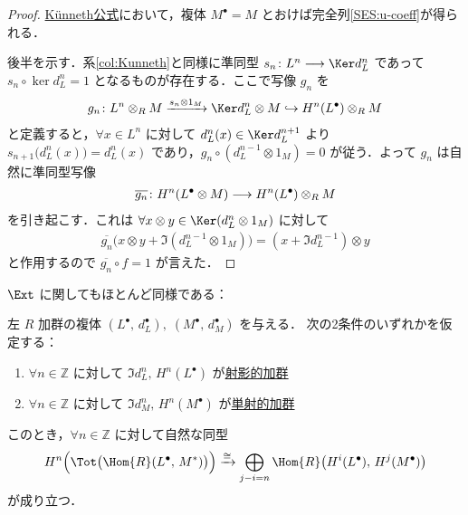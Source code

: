 \documentclass[algtopo_main]{subfiles}
\begin{document}
\begin{proof}
    \hyperref[col:Kunneth]{K\"unneth公式}において，複体 $M^\bullet = M$ とおけば完全列\eqref{SES:u-coeff}が得られる．

    後半を示す．系\ref{col:Kunneth}と同様に準同型 $s_n \colon L^n \lto \Ker d_L^n$ であって $s_n \circ \ker d_L^n = 1$ となるものが存在する．ここで写像 $g_n$ を
    \begin{align}
        g_n \colon L^n \otimes_R M \xrightarrow{s_n \otimes 1_M} \Ker d_L^n \otimes M \hookrightarrow H^n(L^\bullet) \otimes_R M
    \end{align}
    と定義すると，$\forall x \in L^n$ に対して $d_L^n(x) \in \Ker d_L^{n+1}$ より $s_{n+1} \bigl( d_L^n(x) \bigr) = d_L^n(x)$ であり，$g_{n} \circ (d_L^{n-1} \otimes 1_M) = 0$ が従う．よって $g_n$ は自然に準同型写像
    \begin{align}
        \overline{g_n} \colon H^n (L^\bullet \otimes M) \longrightarrow H^n(L^\bullet) \otimes_R M
    \end{align}
    を引き起こす．これは $\forall x \otimes y \in \Ker (d_L^n \otimes 1_M)$ に対して
    \begin{align}
        \overline{g_n} \bigl(x \otimes y + \Im (d_L^{n-1} \otimes 1_M)\bigr) = (x + \Im d_L^{n-1}) \otimes y
    \end{align}
    と作用するので $\overline{g_n} \circ f = 1$ が言えた．
\end{proof}

$\Ext$ に関してもほとんど同様である：

\begin{mylem}[label=lem:Kunneth-Ext]{}
    左 $R$ 加群の複体 $(L^\bullet,\, d_L^\bullet),\; (M^\bullet,\, d_M^\bullet)$ を与える．
    次の2条件のいずれかを仮定する：
    \begin{enumerate}
        \item $\forall n \in \mathbb{Z}$ に対して $\Im d_L^n,\, H^n(L^\bullet)$ が\hyperref[def:proj-mod]{射影的加群}
        \item $\forall n \in \mathbb{Z}$ に対して $\Im d_M^n,\, H^n(M^\bullet)$ が\hyperref[def:inj-mod]{単射的加群}
    \end{enumerate}
    

    このとき，$\forall n \in \mathbb{Z}$ に対して自然な同型
    \begin{align}
        H^n \Bigl( \Tot \bigl( \Hom{R}(L^\bullet,\, M^*) \bigr)  \Bigr)  \xrightarrow{\cong} \bigoplus_{j-i = n} \Hom{R} \bigl(H^i(L^\bullet),\, H^j(M^\bullet)\bigr)
    \end{align}
    が成り立つ．
\end{mylem}
\end{document}
